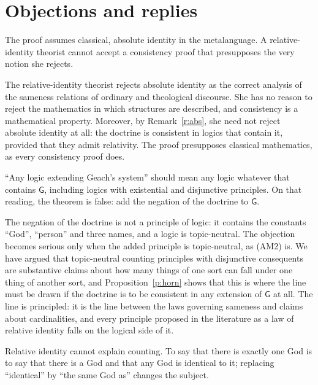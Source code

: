 \documentclass{situationist-preprint}
\begin{document}
\section{Objections and replies}

\begin{objection}
The proof assumes classical, absolute identity in the metalanguage. A relative-identity theorist cannot accept a consistency proof that presupposes the very notion she rejects.
\end{objection}

\begin{reply}
The relative-identity theorist rejects absolute identity as the correct analysis of the sameness relations of ordinary and theological discourse. She has no reason to reject the mathematics in which structures are described, and consistency is a mathematical property. Moreover, by Remark~\ref{r:abs}, she need not reject absolute identity at all: the doctrine is consistent in logics that contain it, provided that they admit relativity. The proof presupposes classical mathematics, as every consistency proof does.
\end{reply}

\begin{objection}
\enquote{Any logic extending Geach's system} should mean any logic whatever that contains $\mathsf{G}$, including logics with existential and disjunctive principles. On that reading, the theorem is false: add the negation of the doctrine to $\mathsf{G}$.
\end{objection}

\begin{reply}
The negation of the doctrine is not a principle of logic: it contains the constants \enquote{God}, \enquote{person} and three names, and a logic is topic-neutral. The objection becomes serious only when the added principle is topic-neutral, as (AM2) is. We have argued that topic-neutral counting principles with disjunctive consequents are substantive claims about how many things of one sort can fall under one thing of another sort, and Proposition~\ref{p:horn} shows that this is where the line must be drawn if the doctrine is to be consistent in any extension of $\mathsf{G}$ at all. The line is principled: it is the line between the laws governing sameness and claims about cardinalities, and every principle proposed in the literature as a law of relative identity falls on the logical side of it.
\end{reply}

\begin{objection}[Cartwright]
Relative identity cannot explain counting. To say that there is exactly one God is to say that there is a God and that any God is identical to it; replacing \enquote{identical} by \enquote{the same God as} changes the subject.
\end{objection}
\end{document}
